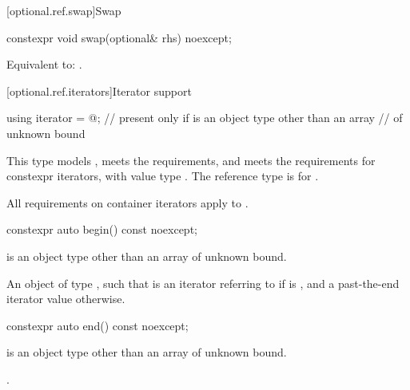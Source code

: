 [optional.ref.swap]{Swap}

\begin{itemdecl}
constexpr void swap(optional& rhs) noexcept;
\end{itemdecl}

\begin{itemdescr}
\pnum
\effects
Equivalent to: .
\end{itemdescr}

[optional.ref.iterators]{Iterator support}

\begin{itemdecl}
using iterator = @\impdefnc@;        // present only if  is an object type other than an array
                                                // of unknown bound
\end{itemdecl}

\begin{itemdescr}
\pnum
This type
models ,
meets the  requirements,
and meets the requirements for constexpr iterators,
with value type .
The reference type is  for .

\pnum
All requirements on container iterators apply to
.
\end{itemdescr}

\begin{itemdecl}
constexpr auto begin() const noexcept;
\end{itemdecl}

\begin{itemdescr}
\pnum
\constraints
{} is an object type other than an array of unknown bound.

\pnum
\returns
  An object  of type , such that
   is an iterator referring to 
  if  is , and
  a past-the-end iterator value otherwise.
\end{itemdescr}

\begin{itemdecl}
constexpr auto end() const noexcept;
\end{itemdecl}

\begin{itemdescr}
\pnum
\constraints
{} is an object type other than an array of unknown bound.

\pnum
\returns
{}.
\end{itemdescr}

